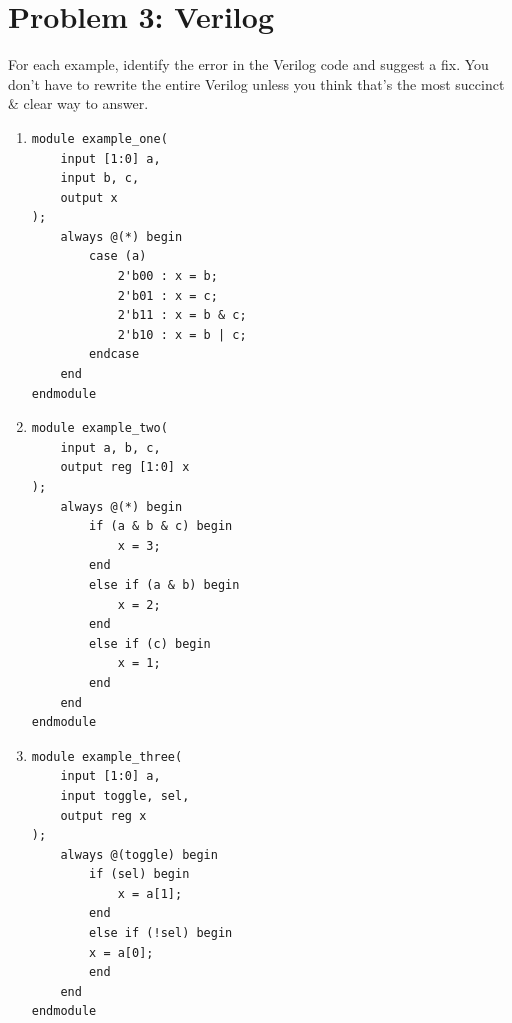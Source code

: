 \vspace{70mm}


\section*{Problem 3: Verilog}
For each example, identify the error in the Verilog code and suggest a fix. You don't have to rewrite the entire Verilog unless you think that's the most succinct \& clear way to answer.
\begin{enumerate}[label=(\alph*)]

\item \begin{verbatim}
module example_one(
	input [1:0] a,
	input b, c,
	output x
);
	always @(*) begin
	    case (a)
	        2'b00 : x = b;
	        2'b01 : x = c;
	        2'b11 : x = b & c;
	        2'b10 : x = b | c;
	    endcase
	end
endmodule
\end{verbatim}
\pagebreak

\item \begin{verbatim}
module example_two(
	input a, b, c,
	output reg [1:0] x
);
    always @(*) begin
    	if (a & b & c) begin
    		x = 3;
    	end
    	else if (a & b) begin
    		x = 2;
    	end
    	else if (c) begin
    		x = 1;
    	end
    end
endmodule
\end{verbatim}
\vspace{30mm}
\item \begin{verbatim}
module example_three(
	input [1:0] a,
	input toggle, sel, 
	output reg x
);
    always @(toggle) begin
        if (sel) begin
            x = a[1];
        end
        else if (!sel) begin
    	x = a[0];
        end
    end
endmodule
\end{verbatim}

\end{enumerate}







